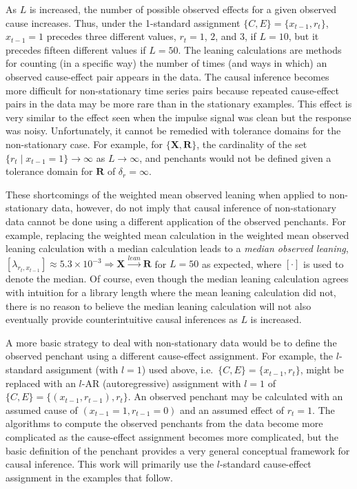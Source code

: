 \documentclass[twocolumn,aps,pre,groupedaddress]{revtex4-1}
\begin{document}
As $L$ is increased, the number of possible observed effects for a given observed cause increases.  Thus, under the 1-standard assignment $\{C,E\} = \{x_{t-1},r_t\}$, $x_{t-1}=1$ precedes three different values, $r_t = 1$, $2$, and $3$, if $L=10$, but it precedes fifteen different values if $L=50$.  The leaning calculations are methods for counting (in a specific way) the number of times (and ways in which) an observed cause-effect pair appears in the data.  The causal inference becomes more difficult for non-stationary time series pairs because repeated cause-effect pairs in the data may be more rare than in the stationary examples.  This effect is very similar to the effect seen when the impulse signal was clean but the response was noisy.  Unfortunately, it cannot be remedied with tolerance domains for the non-stationary case.  For example, for $\{\mathbf{X},\mathbf{R}\}$, the cardinality of the set $\{r_t\;|\;x_{t-1}=1\}\rightarrow\infty$ as $L\rightarrow\infty$, and penchants would not be defined given a tolerance domain for $\mathbf{R}$ of $\delta_r=\infty$.

These shortcomings of the weighted mean observed leaning when applied to non-stationary data, however, do not imply that causal inference of non-stationary data cannot be done using a different application of the observed penchants.  For example, replacing the weighted mean calculation in the weighted mean observed leaning calculation with a median calculation leads to a {\em median observed leaning}, $[\lambda_{r_t,x_{t-1}}] \approx 5.3\times 10^{-3}\Rightarrow \mathbf{X}\xrightarrow{lean}\mathbf{R}$ for $L=50$ as expected, where $[\cdot]$ is used to denote the median.  Of course, even though the median leaning calculation agrees with intuition for a library length where the mean leaning calculation did not, there is no reason to believe the median leaning calculation will not also eventually provide counterintuitive causal inferences as $L$ is increased.  

A more basic strategy to deal with non-stationary data would be to define the observed penchant using a different cause-effect assignment.  For example, the $l$-standard assignment (with $l=1$) used above, i.e.\ $\{C,E\}=\{x_{t-1},r_t\}$, might be replaced with an $l$-AR (autoregressive) assignment with $l=1$ of $\{C,E\}=\{(x_{t-1},r_{t-1}),r_t\}$.  An observed penchant may be calculated with an assumed cause of $(x_{t-1}=1,r_{t-1}=0)$ and an assumed effect of $r_t = 1$.  The algorithms to compute the observed penchants from the data become more complicated as the cause-effect assignment becomes more complicated, but the basic definition of the penchant provides a very general conceptual framework for causal inference.  This work will primarily use the $l$-standard cause-effect assignment in the examples that follow.
\end{document}
